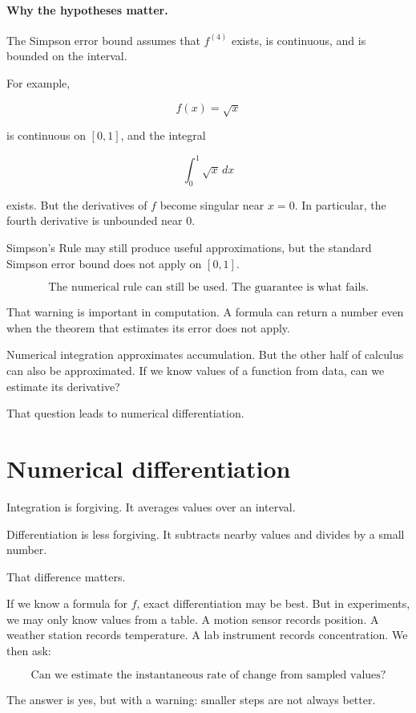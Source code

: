 \paragraph{Why the hypotheses matter.}
The Simpson error bound assumes that \(f^{(4)}\) exists, is continuous, and is bounded
on the interval.

For example,

\[
f(x)=\sqrt{x}
\]

is continuous on \([0,1]\), and the integral

\[
\int_0^1 \sqrt{x}\,dx
\]

exists.  But the derivatives of \(f\) become singular near \(x=0\).  In particular, the
fourth derivative is unbounded near \(0\).

Simpson's Rule may still produce useful approximations, but the standard Simpson
error bound does not apply on \([0,1]\).

\[
\boxed{
\text{The numerical rule can still be used.  The guarantee is what fails.}
}
\]

That warning is important in computation.  A formula can return a number even when
the theorem that estimates its error does not apply.

Numerical integration approximates accumulation.  But the other half of calculus can
also be approximated.  If we know values of a function from data, can we estimate its
derivative?

That question leads to numerical differentiation.

\section{Numerical differentiation}
\label{sec:numerical-differentiation}

Integration is forgiving.  It averages values over an interval.

Differentiation is less forgiving.  It subtracts nearby values and divides by a small
number.

That difference matters.

If we know a formula for \(f\), exact differentiation may be best.  But in experiments,
we may only know values from a table.  A motion sensor records position.  A weather
station records temperature.  A lab instrument records concentration.  We then ask:

\[
\boxed{
\text{Can we estimate the instantaneous rate of change from sampled values?}
}
\]

The answer is yes, but with a warning: smaller steps are not always better.


